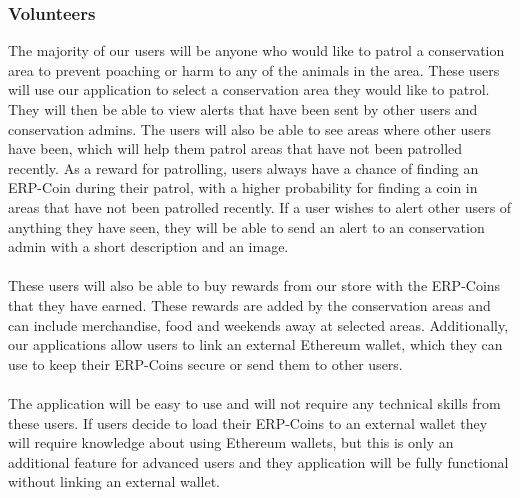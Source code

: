 \documentclass{article}
\begin{document}
\subsubsection*{Volunteers}
The majority of our users will be anyone who would like to patrol a conservation area to prevent poaching or harm to any of the animals in the area. These users will use our application to select a conservation area they would like to patrol. They will then be able to view alerts that have been sent by other users and conservation admins. The users will also be able to see areas where other users have been, which will help them patrol areas that have not been patrolled recently. As a reward for patrolling, users always have a chance of finding an ERP-Coin during their patrol, with a higher probability for finding a coin in areas that have not been patrolled recently. If a user wishes to alert other users of anything they have seen, they will be able to send an alert to an conservation admin with a short description and an image.\\\\These users will also be able to buy rewards from our store with the ERP-Coins that they have earned. These rewards are added by the conservation areas and can include merchandise, food and weekends away at selected areas. Additionally, our applications allow users to link an external Ethereum wallet, which they can use to keep their ERP-Coins secure or send them to other users.\\\\The application will be easy to use and will not require any technical skills from these users. If users decide to load their ERP-Coins to an external wallet they will require knowledge about using Ethereum wallets, but this is only an additional feature for advanced users and they application will be fully functional without linking an external wallet.
\end{document}
